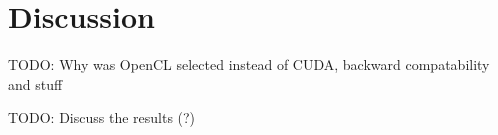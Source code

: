 \chapter{Discussion}

TODO: Why was OpenCL selected instead of CUDA, backward compatability and stuff

TODO: Discuss the results (?)
